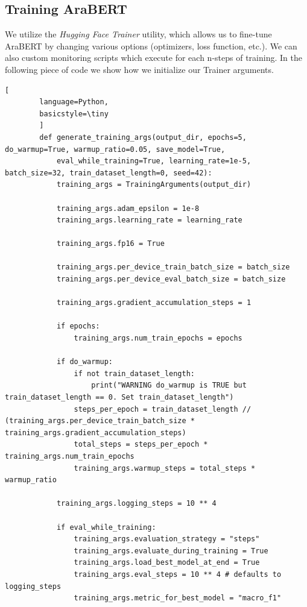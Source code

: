 \documentclass[12pt]{diazessay}
\begin{document}
    \subsection{Training AraBERT}
    We utilize the \emph{Hugging Face Trainer} utility, which allows us to fine-tune AraBERT by changing various options (optimizers, loss function, etc.). We can also custom monitoring scripts which execute for each n-steps of training.
    In the following piece of code we show how we initialize our Trainer arguments.
    \begin{lstlisting}[
        language=Python,
        basicstyle=\tiny
        ]
        def generate_training_args(output_dir, epochs=5, do_warmup=True, warmup_ratio=0.05, save_model=True, 
            eval_while_training=True, learning_rate=1e-5, batch_size=32, train_dataset_length=0, seed=42):
            training_args = TrainingArguments(output_dir)
        
            training_args.adam_epsilon = 1e-8
            training_args.learning_rate = learning_rate
        
            training_args.fp16 = True
        
            training_args.per_device_train_batch_size = batch_size
            training_args.per_device_eval_batch_size = batch_size
        
            training_args.gradient_accumulation_steps = 1
            
            if epochs:
                training_args.num_train_epochs = epochs
        
            if do_warmup:
                if not train_dataset_length:
                    print("WARNING do_warmup is TRUE but train_dataset_length == 0. Set train_dataset_length")
                steps_per_epoch = train_dataset_length // (training_args.per_device_train_batch_size * training_args.gradient_accumulation_steps)
                total_steps = steps_per_epoch * training_args.num_train_epochs
                training_args.warmup_steps = total_steps * warmup_ratio 
            
            training_args.logging_steps = 10 ** 4
            
            if eval_while_training:
                training_args.evaluation_strategy = "steps"
                training_args.evaluate_during_training = True
                training_args.load_best_model_at_end = True
                training_args.eval_steps = 10 ** 4 # defaults to logging_steps
                training_args.metric_for_best_model = "macro_f1"
            

\end{lstlisting}
\end{document}
